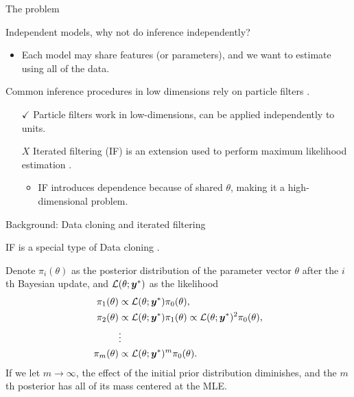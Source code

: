 \documentclass[aspectratio=169]{beamer}\usepackage[]{graphicx}\usepackage[]{xcolor}
\begin{document}
\begin{frame}{The problem}

  Independent models, why not do inference independently? 

  \begin{itemize}
    \item Each model may share features (or parameters), and we want to estimate using all of the data. 
  \end{itemize}
  Common inference procedures in low dimensions rely on particle filters \citep{arulampalam02}.
  \begin{itemize}
    \item[{\color{green} $\checkmark$}] Particle filters work in low-dimensions, can be applied independently to units.
    \item[{\color{red} $X$}] Iterated filtering (IF) is an extension used to perform maximum likelihood estimation \citep{ionides15}.
    \begin{itemize}
      \item IF introduces dependence because of shared $\theta$, making it a high-dimensional problem.
    \end{itemize}
  \end{itemize}

\end{frame}

\begin{frame}{Background: Data cloning and iterated filtering}
  
  IF is a special type of Data cloning \citep{lele07}. 
  
  Denote $\pi_i(\theta)$ as the posterior distribution of the parameter vector $\theta$ after the $i$th Bayesian update, and $\mathcal{L}(\theta; \bm{y}^*)$ as the likelihood
\begin{align*}
\pi_1(\theta) &\propto \mathcal{L}(\theta; \bm{y}^*)\pi_0(\theta), \\
\pi_2(\theta) &\propto \mathcal{L}(\theta; \bm{y}^*)\pi_1(\theta) \propto \mathcal{L}(\theta; \bm{y}^*)^2\pi_0(\theta),\\
&\vdots\\
\pi_m(\theta) &\propto \mathcal{L}(\theta; \bm{y}^*)^m\pi_0(\theta).
\end{align*}
If we let $m\rightarrow \infty$, the effect of the initial prior distribution diminishes, and the $m$th posterior has all of its mass centered at the MLE.

\end{frame}
\end{document}
